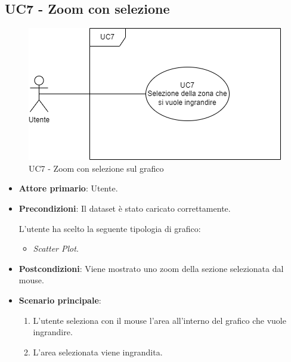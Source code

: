 \subsection{UC7 - Zoom con selezione}
\label{sec:UC7}
\begin{figure}[h!]
    \centering
    \includegraphics[scale=0.55]{../../assets/zoom_selezione.png}
    \caption{UC7 - Zoom con selezione sul grafico}
\end{figure}
\begin{itemize}
    \item \textbf{Attore primario}: Utente.
    \item \textbf{Precondizioni}: Il dataset è stato caricato correttamente. \par L'utente ha scelto la seguente tipologia di grafico:
    \begin{itemize}
    		\item \textit{Scatter Plot}.
    \end{itemize}
    \item \textbf{Postcondizioni}: Viene mostrato uno zoom della sezione selezionata dal mouse.
    \item \textbf{Scenario principale}:
          \begin{enumerate}
              \item L'utente seleziona con il mouse l'area all'interno del grafico che vuole ingrandire.
              \item L'area selezionata viene ingrandita.
          \end{enumerate}
\end{itemize}

\newpage


